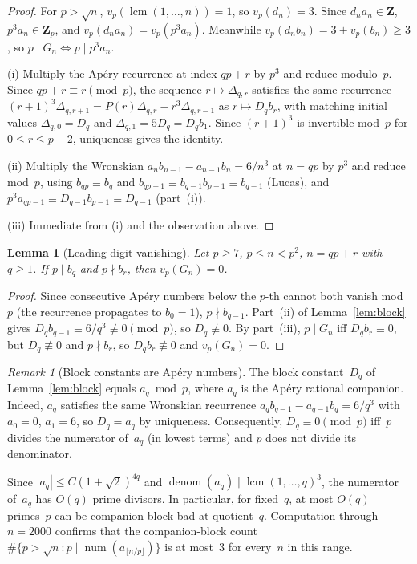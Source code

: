 \documentclass[11pt]{article}
\newtheorem{lemma}[theorem]{Lemma}
\theoremstyle{definition}
\theoremstyle{remark}
\newtheorem{remark}[theorem]{Remark}
\begin{document}
\begin{proof}
For $p > \sqrt{n}$, $v_p(\operatorname{lcm}(1,\ldots,n)) = 1$,
so $v_p(d_n) = 3$. Since $d_n a_n \in \mathbf{Z}$,
$p^3 a_n \in \mathbf{Z}_p$, and $v_p(d_n a_n) = v_p(p^3 a_n)$.
Meanwhile $v_p(d_n b_n) = 3 + v_p(b_n) \ge 3$, so
$p \mid G_n \Leftrightarrow p \mid p^3 a_n$.

(i) Multiply the Ap\'ery recurrence at index $qp + r$
by $p^3$ and reduce modulo~$p$. Since
$qp + r \equiv r \pmod{p}$,
the sequence $r \mapsto \Delta_{q,r}$
satisfies the same recurrence
$(r+1)^3 \Delta_{q,r+1} = P(r)\Delta_{q,r} - r^3 \Delta_{q,r-1}$
as $r \mapsto D_q b_r$,
with matching initial values $\Delta_{q,0} = D_q$
and $\Delta_{q,1} = 5 D_q = D_q b_1$.
Since $(r+1)^3$ is invertible mod~$p$
for $0 \le r \le p-2$, uniqueness gives the identity.

(ii) Multiply the Wronskian $a_n b_{n-1} - a_{n-1} b_n = 6/n^3$
at $n = qp$ by $p^3$ and reduce mod~$p$,
using $b_{qp} \equiv b_q$ and
$b_{qp-1} \equiv b_{q-1}b_{p-1} \equiv b_{q-1}$ (Lucas),
and $p^3 a_{qp-1} \equiv D_{q-1}b_{p-1} \equiv D_{q-1}$ (part~(i)).

(iii) Immediate from (i) and the observation above.
\end{proof}

\begin{lemma}[Leading-digit vanishing]\label{lem:leading-vanish}
Let $p \ge 7$, $p \le n < p^2$,
$n = qp + r$ with $q \ge 1$.
If $p \mid b_q$ and $p \nmid b_r$,
then $v_p(G_n) = 0$.
\end{lemma}

\begin{proof}
Since consecutive Ap\'ery numbers below the $p$-th
cannot both vanish mod~$p$
(the recurrence propagates to $b_0 = 1$),
$p \nmid b_{q-1}$.
Part~(ii) of Lemma~\ref{lem:block} gives
$D_q b_{q-1} \equiv 6/q^3 \not\equiv 0 \pmod{p}$,
so $D_q \not\equiv 0$.
By part~(iii), $p \mid G_n$ iff $D_q b_r \equiv 0$,
but $D_q \not\equiv 0$ and $p \nmid b_r$,
so $D_q b_r \not\equiv 0$ and $v_p(G_n) = 0$.
\end{proof}

\begin{remark}[Block constants are Ap\'ery numbers]\label{rem:block-apery}
The block constant~$D_q$ of Lemma~\ref{lem:block}
equals $a_q \bmod p$, where $a_q$ is the Ap\'ery
rational companion.
Indeed, $a_q$ satisfies the same Wronskian recurrence
$a_q b_{q-1} - a_{q-1} b_q = 6/q^3$ with
$a_0 = 0$, $a_1 = 6$, so $D_q = a_q$ by uniqueness.
Consequently, $D_q \equiv 0 \pmod{p}$ iff~$p$
divides the numerator of~$a_q$ (in lowest terms)
and $p$ does not divide its denominator.

Since $|a_q| \le C(1+\sqrt{2})^{4q}$ and
$\operatorname{denom}(a_q) \mid \operatorname{lcm}(1,\ldots,q)^3$,
the numerator of~$a_q$ has $O(q)$ prime divisors.
In particular, for fixed~$q$, at most $O(q)$ primes~$p$
can be companion-block bad at quotient~$q$.
Computation through $n = 2000$ confirms that the
companion-block count
$\#\{p > \sqrt{n} : p \mid \operatorname{num}(a_{\lfloor n/p \rfloor})\}$
is at most~$3$ for every~$n$ in this range.
\end{remark}
\end{document}

